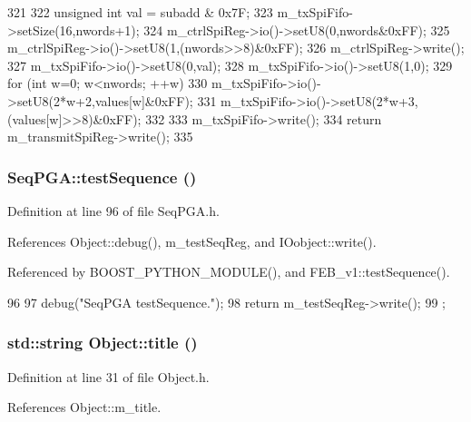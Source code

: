 \begin{DoxyCode}
321                                                                                  
              {
322   unsigned int val = subadd & 0x7F; 
323   m_txSpiFifo->setSize(16,nwords+1);
324   m_ctrlSpiReg->io()->setU8(0,nwords&0xFF);
325   m_ctrlSpiReg->io()->setU8(1,(nwords>>8)&0xFF);
326   m_ctrlSpiReg->write();
327   m_txSpiFifo->io()->setU8(0,val);
328   m_txSpiFifo->io()->setU8(1,0);
329   for (int w=0; w<nwords; ++w) {
330     m_txSpiFifo->io()->setU8(2*w+2,values[w]&0xFF);
331     m_txSpiFifo->io()->setU8(2*w+3,(values[w]>>8)&0xFF);
332   }
333   m_txSpiFifo->write();
334   return m_transmitSpiReg->write();
335 }
\end{DoxyCode}
\hypertarget{classSeqPGA_a299f2826e5edba5636f0f41233683156}{
\subsubsection[{testSequence}]{ SeqPGA::testSequence ()}}
\label{classSeqPGA_a299f2826e5edba5636f0f41233683156}


Definition at line 96 of file SeqPGA.h.

References Object::debug(), m\_\-testSeqReg, and IOobject::write().

Referenced by BOOST\_\-PYTHON\_\-MODULE(), and FEB\_\-v1::testSequence().


\begin{DoxyCode}
96                             {
97     debug("SeqPGA testSequence.");
98     return m_testSeqReg->write();
99   };
\end{DoxyCode}
\hypertarget{classObject_a73a0f1a41828fdd8303dd662446fb6c3}{
\subsubsection[{title}]{\setlength{\rightskip}{0pt plus 5cm}std::string Object::title ()}}
\label{classObject_a73a0f1a41828fdd8303dd662446fb6c3}


Definition at line 31 of file Object.h.

References Object::m\_\-title.

